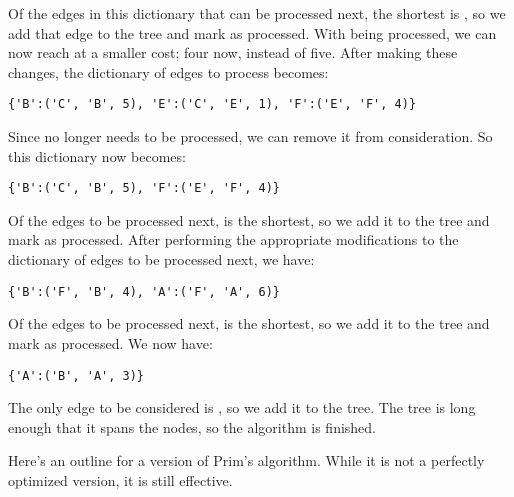 Of the edges in this dictionary that can be processed next, the shortest is , so we add that edge to the tree and mark  as processed.
With  being processed, we can now reach  at a smaller cost; four now, instead of five.
After making these changes, the dictionary of edges to process becomes:
 
\begin{lstlisting}
{'B':('C', 'B', 5), 'E':('C', 'E', 1), 'F':('E', 'F', 4)}
\end{lstlisting}

Since  no longer needs to be processed, we can remove it from consideration.
So this dictionary now becomes:

\begin{lstlisting}
{'B':('C', 'B', 5), 'F':('E', 'F', 4)}
\end{lstlisting}

Of the edges to be processed next,  is the shortest, so we add it to the tree and mark  as processed.
After performing the appropriate modifications to the dictionary of edges to be processed next, we have:
\begin{lstlisting}
{'B':('F', 'B', 4), 'A':('F', 'A', 6)}
\end{lstlisting}

Of the edges to be processed next,  is the shortest, so we add it to the tree and mark  as processed.
We now have:
\begin{lstlisting}
{'A':('B', 'A', 3)}
\end{lstlisting}

The only edge to be considered is , so we add it to the tree.
The tree is long enough that it spans the nodes, so the algorithm is finished.

Here's an outline for a version of Prim's algorithm.
While it is not a perfectly optimized version, it is still effective.

